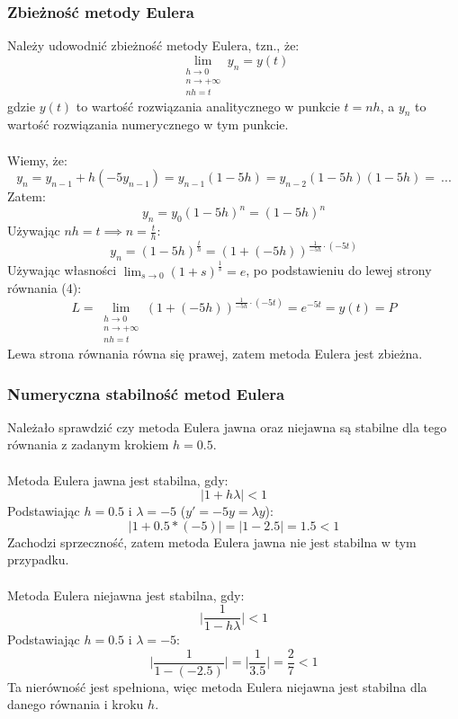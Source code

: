 \documentclass{article}
\begin{document}
\subsubsection{Zbieżność metody Eulera}
Należy udowodnić zbieżność metody Eulera, tzn., że:
\begin{equation}
    \lim_{\substack{h\to0 \\ n\to+\infty \\ nh = t}}y_n = y(t)
\end{equation}
gdzie $y(t)$ to wartość rozwiązania analitycznego w punkcie $t=nh$, a $y_n$ to wartość rozwiązania numerycznego w tym punkcie.
\\\\
Wiemy, że:
$$y_n = y_{n-1} + h(-5y_{n-1}) = y_{n-1}(1-5h) = y_{n-2}(1-5h)(1-5h) =\ ...$$
Zatem:
$$y_n = y_0(1-5h)^n = (1-5h)^n$$
Używając $nh = t \implies n = \frac{t}{h}$:
$$y_n = (1 - 5h)^{\frac{t}{h}} = (1 + (-5h))^{\frac{1}{-5h}\cdot(-5t)}$$
Używając własności $\lim_{s\to0} (1+s)^{\frac{1}{s}} = e$, po podstawieniu do lewej strony równania (4):
$$L = \lim_{\substack{h\to0 \\ n\to+\infty \\ nh = t}}(1 + (-5h))^{\frac{1}{-5h}\cdot(-5t)} = e^{-5t} = y(t) = P$$
Lewa strona równania równa się prawej, zatem metoda Eulera jest zbieżna.

\subsubsection{Numeryczna stabilność metod Eulera}
Należało sprawdzić czy metoda Eulera jawna oraz niejawna są stabilne dla tego równania z zadanym krokiem $h=0.5$.
\\\\
Metoda Eulera jawna jest stabilna, gdy:
$$|1+h\lambda| < 1$$
Podstawiając $h=0.5$ i $\lambda = -5$ ($y'=-5y=\lambda y$):
$$|1+0.5*(-5)| = |1-2.5| = 1.5 < 1$$
Zachodzi sprzeczność, zatem metoda Eulera jawna nie jest stabilna w tym przypadku.
\\\\
Metoda Eulera niejawna jest stabilna, gdy:
$$\bigg|\frac{1}{1-h\lambda}\bigg| < 1$$
Podstawiając $h=0.5$ i $\lambda = -5$:
$$\bigg|\frac{1}{1-(-2.5)}\bigg| = \bigg|\frac{1}{3.5}\bigg| = \frac{2}{7} < 1$$
Ta nierówność jest spełniona, więc metoda Eulera niejawna jest stabilna dla danego równania i kroku $h$.
\end{document}
